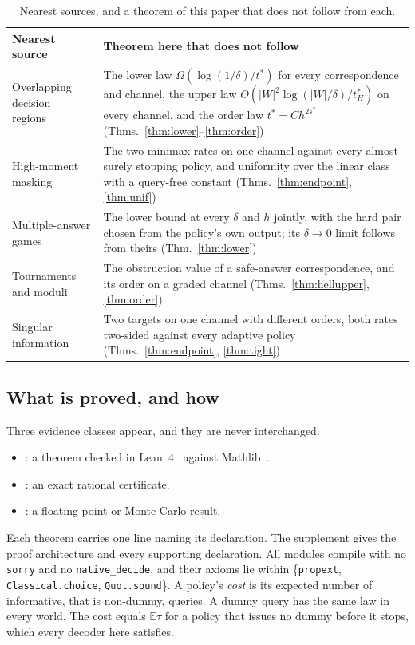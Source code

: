 \begin{table}[h]
\caption{Nearest sources, and a theorem of this paper that does not follow from each.}
\label{tab:prior}
\centering
\footnotesize
\begin{tabular}{@{}p{}p{}@{}}
\toprule
Nearest source & Theorem here that does not follow \\
\midrule
Overlapping decision regions~\cite{javdani2014} & The lower law $\Omega(\log(1/\delta)/t^{*})$
for every correspondence and channel, the upper law $O(|W|^{2}\log(|W|/\delta)/t^{*}_{H})$ on every
channel, and the order law $t^{*}=Ch^{2s^{*}}$ (Thms.~\ref{thm:lower}--\ref{thm:order}) \\
High-moment masking~\cite{grosso2014,duc2015} & The two minimax rates on one channel against
every almost-surely stopping policy, and uniformity over the linear class with a
query-free constant (Thms.~\ref{thm:endpoint}, \ref{thm:unif}) \\
Multiple-answer games~\cite{degenne2019,wangyou2026} & The lower bound at every $\delta$ and
$h$ jointly, with the hard pair chosen from the policy's own output; its $\delta\to0$ limit
follows from theirs (Thm.~\ref{thm:lower}) \\
Tournaments and moduli~\cite{lecam1973,birge1983,donoho1991} & The obstruction value of a
safe-answer correspondence, and its order on a graded channel (Thms.~\ref{thm:hellupper},
\ref{thm:order}) \\
Singular information~\cite{rotnitzky2000,heinrich2018,honguyen2015} & Two targets on one
channel with different orders, both rates two-sided against every adaptive policy
(Thms.~\ref{thm:endpoint}, \ref{thm:tight}) \\
\bottomrule
\end{tabular}
\end{table}

\subsection{What is proved, and how}

Three evidence classes appear, and they are never interchanged.
\begin{itemize}
\item \PROVED: a theorem checked in Lean~4~\cite{demoura2021} against Mathlib~\cite{mathlib2020}.
\item \CERT: an exact rational certificate.
\item \NUM: a floating-point or Monte Carlo result.
\end{itemize}
Each theorem carries one line naming its declaration. The supplement gives the proof
architecture and every supporting declaration. All modules compile with no \texttt{sorry} and no
\texttt{native\_decide}, and their axioms lie within \{\texttt{propext}, \texttt{Classical.choice},
\texttt{Quot.sound}\}. A policy's \emph{cost} is its expected number of informative, that is
non-dummy, queries. A dummy query has the same law in every world. The cost equals
$\mathbb{E}\tau$ for a policy that issues no dummy before it stops, which every decoder here
satisfies.

